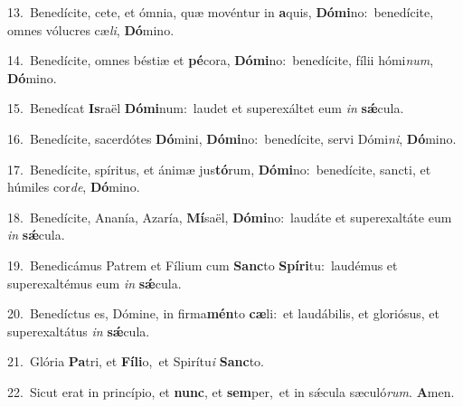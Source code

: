 {\numbfont\textcolor{\numbcolor}{13.}}~Benedícite, cete, et ómnia, quæ movéntur in \textbf{a}\-quis, \textbf{Dó}\-\textbf{mi}no:~\star benedícite, omnes vólucres cæ\-\textit{li}\-, \textbf{Dó}\-mino.\par
{\numbfont\textcolor{\numbcolor}{14.}}~Benedícite, omnes béstiæ et \textbf{pé}\-cora, \textbf{Dó}\-\textbf{mi}no:~\star benedícite, fílii hómi\-\textit{num}\-, \textbf{Dó}\-mino.\par
{\numbfont\textcolor{\numbcolor}{15.}}~Benedícat \textbf{Is}\-raël \textbf{Dó}\-\textbf{mi}num:~\star laudet et superexáltet eum \textit{in} \textbf{sǽ}\-cula.\par
{\numbfont\textcolor{\numbcolor}{16.}}~Benedícite, sacerdótes \textbf{Dó}\-mini, \textbf{Dó}\-\textbf{mi}no:~\star benedícite, servi Dómi\-\textit{ni}\-, \textbf{Dó}\-mino.\par
{\numbfont\textcolor{\numbcolor}{17.}}~Benedícite, spíritus, et ánimæ jus\-\textbf{tó}\-rum, \textbf{Dó}\-\textbf{mi}no:~\star benedícite, sancti, et húmiles cor\-\textit{de}\-, \textbf{Dó}\-mino.\par
{\numbfont\textcolor{\numbcolor}{18.}}~Benedícite, Ananía, Azaría, \textbf{Mí}\-saël, \textbf{Dó}\-\textbf{mi}no:~\star laudáte et superexaltáte eum \textit{in} \textbf{sǽ}\-cula.\par
{\numbfont\textcolor{\numbcolor}{19.}}~Benedicámus Patrem et Fílium cum \textbf{Sanc}\-to \textbf{Spí}\-\textbf{ri}tu:~\star laudémus et superexaltémus eum \textit{in} \textbf{sǽ}\-cula.\par
{\numbfont\textcolor{\numbcolor}{20.}}~Benedíctus es, Dómine, in firma\-\textbf{mén}\-to \textbf{cæ}\-li:~\star et laudábilis, et gloriósus, et superexaltátus \textit{in} \textbf{sǽ}\-cula.\par
{\numbfont\textcolor{\numbcolor}{21.}}~Glória \textbf{Pa}\-tri, et \textbf{Fí}\-\textbf{li}o,~\star et Spirítu\textit{i} \textbf{Sanc}\-to.\par
{\numbfont\textcolor{\numbcolor}{22.}}~Sicut erat in princípio, et \textbf{nunc}\-, et \textbf{sem}\-per,~\star et in sǽcula sæculó\-\textit{rum}\-. \textbf{A}\-men.\par
